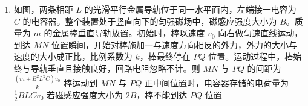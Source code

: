 \documentclass[\gkver]{gaokaozhenti}
\begin{document}
\begin{enumerate}
{D．第一次共速时弹簧处于压缩状态，第二次共速时弹簧处于伸长状态。两次共速之间 $x_N>x_M$，动量守恒使两次共速时的速度相同、系统动能相同。结合 C 项分析可知，$x_N>x_M$ 时系统重力势能变化量与克服摩擦力做功的关系为 $m_Mgx_M\sin\theta+m_Ngx_N\sin\theta-\mu m_Ngx_N\cos\theta<0$，说明此过程系统重力势能变化量小于克服摩擦力做功，即重力对系统做功小于系统因摩擦而损失的能量，因此 M、N 的总动能与弹簧弹性势能之和减少，而总动能不变，因此弹性势能减小，故 D 正确。

故选 AD。
}

\item
如图，两条相距 $L$ 的光滑平行金属导轨位于同一水平面内，左端接一电容为 $C$ 的电容器。整个装置处于竖直向下的匀强磁场中，磁感应强度大小为 $B$。质量为 $m$ 的金属棒垂直导轨放置。初始时，棒以速度 $v_0$ 向右做匀速直线运动，到达 $MN$ 位置瞬间，开始对棒施加一与速度方向相反的外力，外力的大小与速度的大小成正比，比例系数为 $k$，棒最终停在 $PQ$ 位置。运动过程中，棒始终与导轨垂直且接触良好，回路电阻忽略不计。则
{$MN$ 与 $PQ$ 的间距为 $\frac{(m+B^2L^2C)v_0}{k}$}
{棒运动到 $MN$ 与 $PQ$ 正中间位置时，电容器存储的电荷量为 $\frac{1}{2}BLCv_0$}
{若磁感应强度大小为 $2B$，棒不能到达 $PQ$ 位置}


\end{enumerate}
\end{document}
